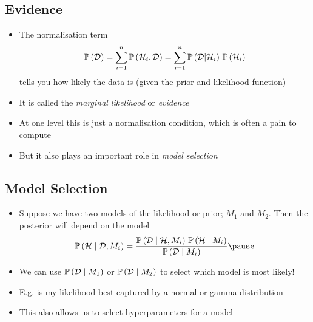 
\begin{slide}
\section[-2]{Evidence}
 
\begin{PauseHighLight}
  \begin{itemize}
  \item The normalisation term 
      \begin{align*}
        \mathbb{P}\left( \mathcal{D} \right) = \sum_{i=1}^n\mathbb{P}\left( \mathcal{H}_i,\mathcal{D} \right)
        = \sum_{i=1}^n \mathbb{P}\left( \mathcal{D}|\mathcal{H}_i \right) \,\mathbb{P}\left( \mathcal{H}_i \right)
      \end{align*}
      tells you how likely the data is (given the prior and likelihood
      function)\pause
    \item It is called the \emph{marginal likelihood}\pause{} or
      \emph{evidence}\pauseb
    \item At one level this is just a normalisation condition\pause,
      which is often a pain to compute\pauseb
    \item But it also plays an important role in \emph{model selection}\pause
  \end{itemize}
\end{PauseHighLight}

\end{slide}



\begin{slide}
\section{Model Selection}
\begin{PauseHighLight}
  \begin{itemize}
  \item Suppose we have two models of the likelihood or prior; $M_1$
    and $M_2$. Then the posterior will depend on the model
    \begin{align*}
      \Prob{\mathcal{H}\mid \data, M_i} = \frac{\Prob{\data \mid
      \mathcal{H}, M_i}\, \Prob{\mathcal{H}\mid M_i}}{\Prob{\data\mid
      M_i}}\pause 
    \end{align*}
  \item We can use $\mathbb{P}\left( \mathcal{D}\mid M_1 \right)$ or $\mathbb{P}\left( \mathcal{D}\mid M_2 \right)$ to
    select which model is most likely!\pause
  \item E.g. is my likelihood best captured by a normal or gamma
    distribution\pause
  \item This also allows us to select hyperparameters for a model\pause
  \end{itemize}
\end{PauseHighLight}


\end{slide}


